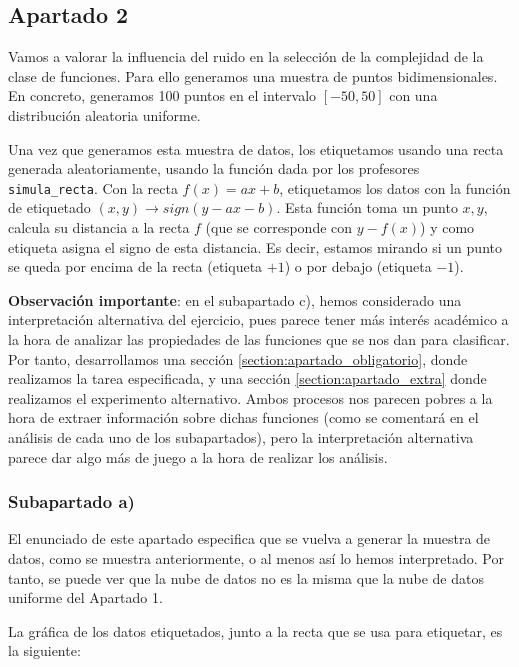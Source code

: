 \documentclass[11pt]{article}
\begin{document}
\subsection{Apartado 2}

Vamos a valorar la influencia del ruido en la selección de la complejidad de la clase de funciones. Para ello generamos una muestra de puntos bidimensionales. En concreto, generamos 100 puntos en el intervalo $[-50, 50]$ con una distribución aleatoria uniforme.

Una vez que generamos esta muestra de datos, los etiquetamos usando una recta generada aleatoriamente, usando la función dada por los profesores \lstinline{simula_recta}. Con la recta $f(x) = ax + b$, etiquetamos los datos con la función de etiquetado $(x, y) \rightarrow sign(y - ax - b)$. Esta función toma un punto $x, y$, calcula su distancia a la recta $f$ (que se corresponde con $y - f(x)$) y como etiqueta asigna el signo de esta distancia. Es decir, estamos mirando si un punto se queda por encima de la recta (etiqueta $+1$) o por debajo (etiqueta $-1$).

\textbf{Observación importante}: en el subapartado c), hemos considerado una interpretación alternativa del ejercicio, pues parece tener más interés académico a la hora de analizar las propiedades de las funciones que se nos dan para clasificar. Por tanto, desarrollamos una sección \ref{section:apartado_obligatorio}, donde realizamos la tarea especificada, y una sección \ref{section:apartado_extra} donde realizamos el experimento alternativo. Ambos procesos nos parecen pobres a la hora de extraer información sobre dichas funciones (como se comentará en el análisis de cada uno de los subapartados), pero la interpretación alternativa parece dar algo más de juego a la hora de realizar los análisis.

\subsubsection{Subapartado a)} \label{section:ejercicio1.2.a}

El enunciado de este apartado especifica que se vuelva a generar la muestra de datos, como se muestra anteriormente, o al menos así lo hemos interpretado. Por tanto, se puede ver que la nube de datos no es la misma que la nube de datos uniforme del Apartado 1.

La gráfica de los datos etiquetados, junto a la recta que se usa para etiquetar, es la siguiente:
\end{document}
